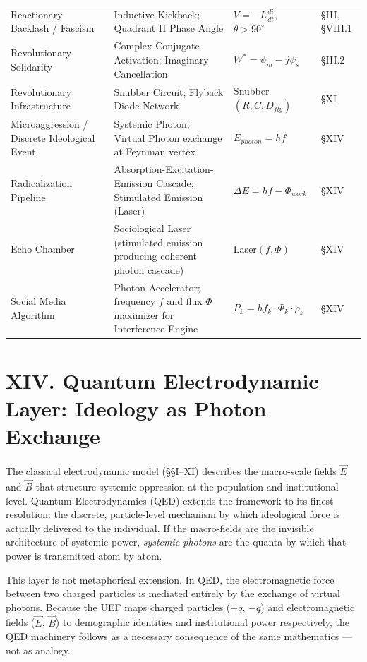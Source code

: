 \documentclass[12pt]{book}
\numberwithin{equation}{chapter}
\begin{document}
\begin{center}
\begin{tabular}{llll}
Reactionary Backlash / Fascism & Inductive Kickback; Quadrant II Phase Angle & $V = -L\frac{di}{dt}$, $\theta > 90^\circ$ & §III, §VIII.1  \\
Revolutionary Solidarity & Complex Conjugate Activation; Imaginary Cancellation & $W^* = \psi_m - j\psi_s$ & §III.2  \\
Revolutionary Infrastructure & Snubber Circuit; Flyback Diode Network & Snubber$(R,C,D_{fly})$ & §XI  \\
Microaggression / Discrete Ideological Event & Systemic Photon; Virtual Photon exchange at Feynman vertex & $E_{photon} = hf$ & §XIV  \\
Radicalization Pipeline & Absorption-Excitation-Emission Cascade; Stimulated Emission (Laser) & $\Delta E = hf - \Phi_{work}$ & §XIV  \\
Echo Chamber & Sociological Laser (stimulated emission producing coherent photon cascade) & Laser$(f, \Phi)$ & §XIV  \\
Social Media Algorithm & Photon Accelerator; frequency $f$ and flux $\Phi$ maximizer for Interference Engine & $P_k = hf_k \cdot \Phi_k \cdot \rho_k$ & §XIV  \\
\bottomrule
\end{tabular}
\end{center}

\section{XIV. Quantum Electrodynamic Layer: Ideology as Photon Exchange}

    The classical electrodynamic model (§§I–XI) describes the macro-scale fields $\vec{E}$ and $\vec{B}$ that structure systemic oppression at the population and institutional level. Quantum Electrodynamics (QED) extends the framework to its finest resolution: the discrete, particle-level mechanism by which ideological force is actually delivered to the individual. If the macro-fields are the invisible architecture of systemic power, \emph{systemic photons} are the quanta by which that power is transmitted atom by atom.
  

    This layer is not metaphorical extension. In QED, the electromagnetic force between two charged particles is mediated entirely by the exchange of virtual photons. Because the UEF maps charged particles ($+q$, $-q$) and electromagnetic fields ($\vec{E}$, $\vec{B}$) to demographic identities and institutional power respectively, the QED machinery follows as a necessary consequence of the same mathematics — not as analogy.
  
\end{document}
